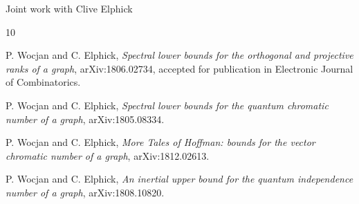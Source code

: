 \documentclass{beamer}
\renewcommand{\>}{\rangle}
\newcommand{\<}{\langle}
\begin{document}
%

\begin{frame}{Joint work with Clive Elphick}

\begin{thebibliography}{10}

P. Wocjan and C. Elphick, \emph{Spectral lower bounds for the orthogonal and projective ranks of a graph}, arXiv:1806.02734, accepted for publication in Electronic Journal of Combinatorics.

P. Wocjan and C. Elphick, \emph{Spectral lower bounds for the quantum chromatic number of a graph},  arXiv:1805.08334. 

P. Wocjan and C. Elphick, \emph{More Tales of Hoffman: bounds for the vector chromatic number of a graph}, arXiv:1812.02613.

P. Wocjan and C. Elphick, \emph{An inertial upper bound for the quantum independence number of a graph},  arXiv:1808.10820.
\end{thebibliography}


\end{frame}

%
\end{document}
